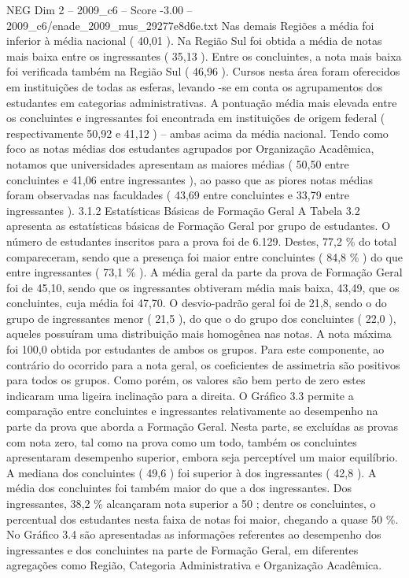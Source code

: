 \begin{textsample}{NEG Dim 2 – 2009\_c6 – Score -3.00 – 2009\_c6/enade\_2009\_mus\_29277e8d6e.txt}
Nas demais Regiões a média foi inferior à média nacional ( 40,01 ).
Na Região Sul foi obtida a média de notas mais baixa entre os ingressantes ( 35,13 ).
Entre os concluintes, a nota mais baixa foi verificada também na Região Sul ( 46,96 ).
Cursos nesta área foram oferecidos em instituições de todas as esferas, levando -se em conta os agrupamentos dos estudantes em categorias administrativas.
A pontuação média mais elevada entre os concluintes e ingressantes foi encontrada em instituições de origem federal ( respectivamente 50,92 e 41,12 ) – ambas acima da média nacional.
Tendo como foco as notas médias dos estudantes agrupados por Organização Acadêmica, notamos que universidades apresentam as maiores médias ( 50,50 entre concluintes e 41,06 entre ingressantes ), ao passo que as piores notas médias foram observadas nas faculdades ( 43,69 entre concluintes e 33,79 entre ingressantes ). 3.1.2 Estatísticas Básicas de Formação Geral A Tabela 3.2 apresenta as estatísticas básicas de Formação Geral por grupo de estudantes.
O número de estudantes inscritos para a prova foi de 6.129.
Destes, 77,2 \% do total compareceram, sendo que a presença foi maior entre concluintes ( 84,8 \% ) do que entre ingressantes ( 73,1 \% ).
A média geral da parte da prova de Formação Geral foi de 45,10, sendo que os ingressantes obtiveram média mais baixa, 43,49, que os concluintes, cuja média foi 47,70.
O desvio-padrão geral foi de 21,8, sendo o do grupo de ingressantes menor ( 21,5 ), do que o do grupo dos concluintes ( 22,0 ), aqueles possuíram uma distribuição mais homogênea nas notas.
A nota máxima foi 100,0 obtida por estudantes de ambos os grupos.
Para este componente, ao contrário do ocorrido para a nota geral, os coeficientes de assimetria são positivos para todos os grupos.
Como porém, os valores são bem perto de zero estes indicaram uma ligeira inclinação para a direita.
O Gráfico 3.3 permite a comparação entre concluintes e ingressantes relativamente ao desempenho na parte da prova que aborda a Formação Geral.
Nesta parte, se excluídas as provas com nota zero, tal como na prova como um todo, também os concluintes apresentaram desempenho superior, embora seja perceptível um maior equilíbrio.
A mediana dos concluintes ( 49,6 ) foi superior à dos ingressantes ( 42,8 ).
A média dos concluintes foi também maior do que a dos ingressantes.
Dos ingressantes, 38,2 \% alcançaram nota superior a 50 ; dentre os concluintes, o percentual dos estudantes nesta faixa de notas foi maior, chegando a quase 50 \%.
No Gráfico 3.4 são apresentadas as informações referentes ao desempenho dos ingressantes e dos concluintes na parte de Formação Geral, em diferentes agregações como Região, Categoria Administrativa e Organização Acadêmica.

\end{textsample}
